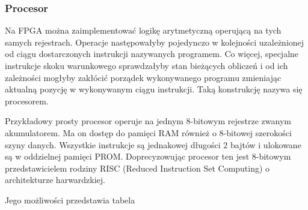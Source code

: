 \documentclass[a4paper,12pt]{article}
\begin{document}
\subsubsection{Procesor}

Na FPGA można zaimplementować logikę arytmetyczną operującą na tych samych rejestrach. Operacje następowałyby pojedynczo w kolejności uzależnionej od ciągu dostarczonych instrukcji nazywanych programem. Co więcej, specjalne instrukcje skoku warunkowego sprawdzałyby stan bieżących obliczeń i od ich zależności mogłyby zakłócić porządek wykonywanego programu zmieniając aktualną pozycję w wykonywanym ciągu instrukcji. Taką konstrukcję nazywa się procesorem.

Przykładowy prosty procesor operuje na jednym 8-bitowym rejestrze zwanym akumulatorem. Ma on dostęp do pamięci RAM również o 8-bitowej szerokości szyny danych. Wszystkie instrukcje są jednakowej długości 2 bajtów i ulokowane są w oddzielnej pamięci PROM. Doprecyzowując procesor ten jest 8-bitowym przedstawicielem rodziny RISC (Reduced Instruction Set Computing) o architekturze harwardzkiej.

Jego możliwości przedstawia tabela
\end{document}

